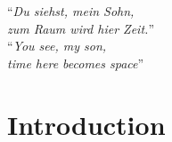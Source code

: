 \section*{}

\begin{minipage}[t]{.48\textwidth}
  \vspace{0pt}

\end{minipage}
\hfill
\begin{minipage}[t]{.48\textwidth}
  \begin{flushright}
    ``\emph{Du siehst, mein Sohn,\\
      zum Raum wird hier Zeit.}''\\
    \vspace{0.5cm}
    ``\emph{You see, my son,\\
      time here becomes space}''
  \end{flushright}
\end{minipage}
\vspace{1cm}


\section{Introduction}
\label{sec:introduction}

\noindent


